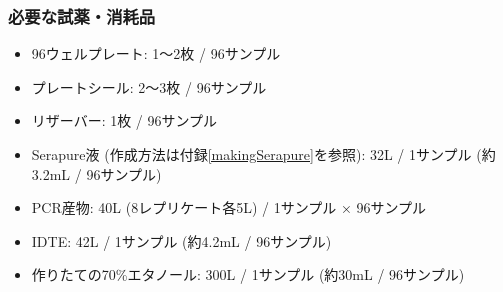 \documentclass[titlepage,10pt,a4paper,uplatex]{jsbook}
\begin{document}
\subsubsection{必要な試薬・消耗品}
\begin{itemize}
\item 96ウェルプレート: 1～2枚 / 96サンプル
\item プレートシール: 2～3枚 / 96サンプル
\item リザーバー: 1枚 / 96サンプル
\item Serapure液 (作成方法は付録\ref{makingSerapure}を参照): 32{\textmu}L / 1サンプル (約3.2mL / 96サンプル)
\item PCR産物: 40{\textmu}L (8レプリケート各5{\textmu}L) / 1サンプル × 96サンプル
\item IDTE: 42{\textmu}L / 1サンプル (約4.2mL / 96サンプル)
\item 作りたての70\%エタノール: 300{\textmu}L / 1サンプル (約30mL / 96サンプル)
\end{itemize}
\end{document}
